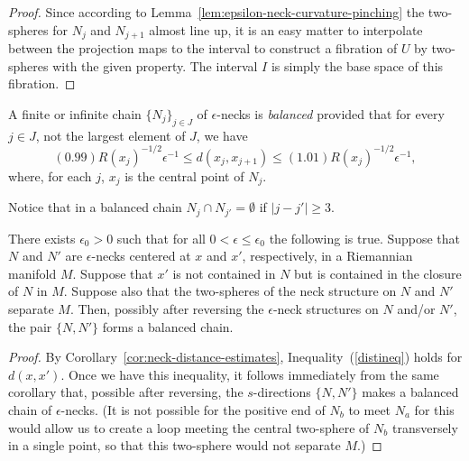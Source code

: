 \begin{proof}
Since according to Lemma~\ref{lem:epsilon-neck-curvature-pinching} the two-spheres for $N_j$
and $N_{j+1}$ almost line up, it is an easy matter to interpolate
between the projection maps to the interval to construct a fibration
of $U$ by two-spheres with the given property. The interval $I$ is
simply the base space of this fibration.
\end{proof}

A finite or infinite chain $\{N_j\}_{j\in J}$ of $\epsilon$-necks is
{\em balanced} provided that for every $j\in J$, not the largest
element of $J$, we have
\begin{equation}\label{distineq}
(0.99)R(x_j)^{-1/2}\epsilon^{-1}\le d(x_j,x_{j+1})\le
(1.01)R(x_j)^{-1/2}\epsilon^{-1},
\end{equation}
where, for each $j$, $x_j$ is the central point of $N_j$.


Notice that in a balanced chain $N_j\cap N_{j'}=\emptyset$ if
$|j-j'|\ge 3$.










\begin{lemma}
\label{lem:two-necks-form-balanced-chain}
\label{firstchain}
There exists $\epsilon_0>0$ such that for all $0<\epsilon\le
\epsilon_0$ the following is true.  Suppose that $N$ and $N'$ are
$\epsilon$-necks centered at $x$ and $x'$, respectively, in a
Riemannian manifold $M$. Suppose that $x'$ is not contained in $N$
but is contained in the closure of $N$ in $M$. Suppose also that the
two-spheres of the neck structure on $N$ and $N'$ separate $M$.
Then, possibly after reversing the $\epsilon$-neck structures on $N$
and/or $N'$, the pair $\{N,N'\}$ forms a balanced chain.
\end{lemma}

\begin{proof}
By Corollary~\ref{cor:neck-distance-estimates},
Inequality~(\ref{distineq}) holds for $d(x,x')$. Once we have this
inequality, it follows immediately from the same corollary that,
possible after reversing, the $s$-directions $\{N,N'\}$ makes a
balanced chain of $\epsilon$-necks. (It is not possible for the
positive end of $N_b$ to meet $N_a$ for this would allow us to
create a loop meeting the central two-sphere of $N_b$ transversely
in a single point, so that this two-sphere would not separate $M$.)
\end{proof}




